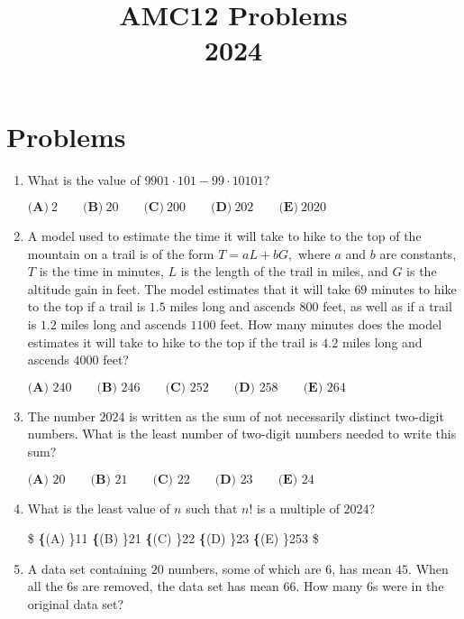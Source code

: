 \documentclass{article}
\title{AMC12 Problems \\ 2024}
\date{}
\begin{document}
\maketitle\thispagestyle{fancy}\newpage\section*{Problems}\begin{enumerate}[label=\arabic*., itemsep=0.5em]\item What is the value of $9901\cdot101-99\cdot10101?$

$\textbf{(A)}~2\qquad\textbf{(B)}~20\qquad\textbf{(C)}~200\qquad\textbf{(D)}~202\qquad\textbf{(E)}~2020$\par \vspace{0.5em}\item A model used to estimate the time it will take to hike to the top of the mountain on a trail is of the form $T=aL+bG,$ where $a$ and $b$ are constants, $T$ is the time in minutes, $L$ is the length of the trail in miles, and $G$ is the altitude gain in feet. The model estimates that it will take $69$ minutes to hike to the top if a trail is $1.5$ miles long and ascends $800$ feet, as well as if a trail is $1.2$ miles long and ascends $1100$ feet. How many minutes does the model estimates it will take to hike to the top if the trail is $4.2$ miles long and ascends $4000$ feet?

$\textbf{(A) }240\qquad\textbf{(B) }246\qquad\textbf{(C) }252\qquad\textbf{(D) }258\qquad\textbf{(E) }264$\par \vspace{0.5em}\item The number $2024$ is written as the sum of not necessarily distinct two-digit numbers. What is the least number of two-digit numbers needed to write this sum?

$\textbf{(A) }20\qquad\textbf{(B) }21\qquad\textbf{(C) }22\qquad\textbf{(D) }23\qquad\textbf{(E) }24$\par \vspace{0.5em}\item What is the least value of $n$ such that $n!$ is a multiple of $2024$?

\$
\textbf\{(A) \}11 \qquad
\textbf\{(B) \}21 \qquad
\textbf\{(C) \}22 \qquad
\textbf\{(D) \}23 \qquad
\textbf\{(E) \}253 \qquad
\$\par \vspace{0.5em}\item A data set containing $20$ numbers, some of which are $6$, has mean $45$. When all the 6s are removed, the data set has mean $66$. How many 6s were in the original data set?


\end{enumerate}
\end{document}
